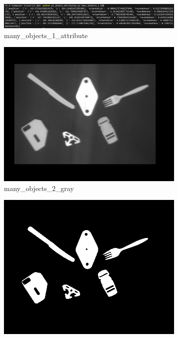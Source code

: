 \documentclass[bwprint]{gmcmthesis}
\numberwithin{figure}{section}
\begin{document}
\begin{enumerate}[label=\alph*.]
\begin{figure}[h]
        \begin{subfigure}[b]{\textwidth}
            \centering
            \includegraphics[width=\textwidth]{../output/many_objects_1_attribute.png}
            \caption{many\_objects\_1\_attribute}
            \label{fig:subfigure4}
        \end{subfigure}
        \newline

        \centering
        \begin{subfigure}[b]{0.3\textwidth}
            \centering
            \includegraphics[width=\textwidth]{../output/many_objects_2_gray.png}
            \caption{many\_objects\_2\_gray}
            \label{fig:subfigure5}
        \end{subfigure}
        \hfill
        \begin{subfigure}[b]{0.3\textwidth}
            \centering
            \includegraphics[width=\textwidth]{../output/many_objects_2_binary.png}

\end{subfigure}
\end{figure}
\end{enumerate}
\end{document}
